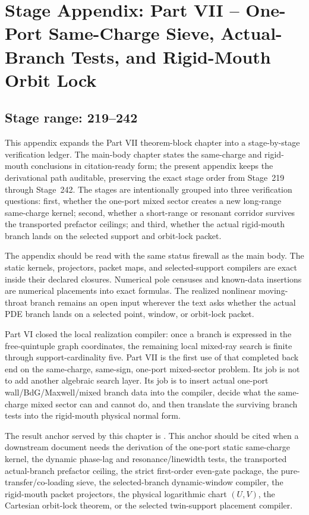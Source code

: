 \chapter{Stage Appendix: Part VII -- One-Port Same-Charge Sieve, Actual-Branch Tests, and Rigid-Mouth Orbit Lock}
\label{app:stage-part-7}

\section*{Stage range: 219--242}

This appendix expands the Part VII theorem-block chapter into a stage-by-stage verification ledger.  The main-body chapter states the same-charge and rigid-mouth conclusions in citation-ready form; the present appendix keeps the derivational path auditable, preserving the exact stage order from Stage~219 through Stage~242.  The stages are intentionally grouped into three verification questions: first, whether the one-port mixed sector creates a new long-range same-charge kernel; second, whether a short-range or resonant corridor survives the transported prefactor ceilings; and third, whether the actual rigid-mouth branch lands on the selected support and orbit-lock packet.

The appendix should be read with the same status firewall as the main body.  The static kernels, projectors, packet maps, and selected-support compilers are exact inside their declared closures.  Numerical pole censuses and known-data insertions are numerical placements into exact formulas.  The realized nonlinear moving-throat branch remains an open input wherever the text asks whether the actual PDE branch lands on a selected point, window, or orbit-lock packet.

Part VI closed the local realization compiler: once a branch is expressed in the free-quintuple graph coordinates, the remaining local mixed-ray search is finite through support-cardinality five.  Part VII is the first use of that completed back end on the same-charge, same-sign, one-port mixed-sector problem.  Its job is not to add another algebraic search layer.  Its job is to insert actual one-port wall/BdG/Maxwell/mixed branch data into the compiler, decide what the same-charge mixed sector can and cannot do, and then translate the surviving branch tests into the rigid-mouth physical normal form.

The result anchor served by this chapter is .  This anchor should be cited when a downstream document needs the derivation of the one-port static same-charge kernel, the dynamic phase-lag and resonance/linewidth tests, the transported actual-branch prefactor ceiling, the strict first-order even-gate package, the pure-transfer/co-loading sieve, the selected-branch dynamic-window compiler, the rigid-mouth packet projectors, the physical logarithmic chart \((U,V)\), the Cartesian orbit-lock theorem, or the selected twin-support placement compiler.

